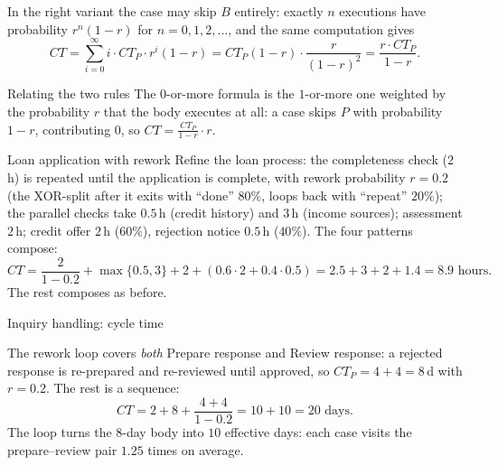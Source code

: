 In the right variant the case may skip $B$ entirely: exactly $n$ executions have probability $r^n (1 - r)$ for $n = 0, 1, 2, \ldots$, and the same computation gives
\[CT = \sum_{i=0}^{\infty} i \cdot CT_P \cdot r^{i} (1 - r) = CT_P (1 - r) \cdot \frac{r}{(1 - r)^2} = \frac{r \cdot CT_P}{1 - r}.\]
\begin{notebox}{Relating the two rules}
The $0$-or-more formula is the $1$-or-more one weighted by the probability $r$ that the body executes at all: a case skips $P$ with probability $1 - r$, contributing $0$, so $CT = \frac{CT_P}{1-r} \cdot r$.
\end{notebox}

\begin{examplebox}{Loan application with rework}
Refine the loan process: the completeness check ($2$\,h) is repeated until the application is complete, with rework probability $r = 0.2$ (the XOR-split after it exits with ``done'' $80\%$, loops back with ``repeat'' $20\%$); the parallel checks take $0.5$\,h (credit history) and $3$\,h (income sources); assessment $2$\,h; credit offer $2$\,h ($60\%$), rejection notice $0.5$\,h ($40\%$). The four patterns compose:
\[CT = \frac{2}{1 - 0.2} + \max\{0.5, 3\} + 2 + (0.6 \cdot 2 + 0.4 \cdot 0.5) = 2.5 + 3 + 2 + 1.4 = 8.9 \text{ hours}.\]
The rest composes as before.
\end{examplebox}

\begin{examplebox}{Inquiry handling: cycle time}
\begin{center}
\end{center}
The rework loop covers \emph{both} Prepare response and Review response: a rejected response is re-prepared and re-reviewed until approved, so $CT_P = 4 + 4 = 8$\,d with $r = 0.2$. The rest is a sequence:
\[CT = 2 + 8 + \frac{4 + 4}{1 - 0.2} = 10 + 10 = 20 \text{ days}.\]
The loop turns the $8$-day body into $10$ effective days: each case visits the prepare--review pair $1.25$ times on average.
\end{examplebox}

